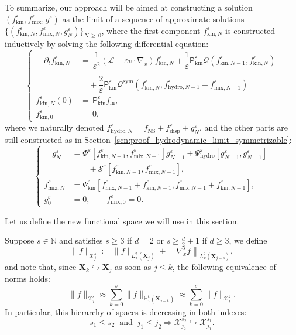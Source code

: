 \documentclass[AHL,Unicode,longabstracts,published]{cedram}
\newcommand{\ini}{\mathrm{in}}
\newcommand{\ns}{\mathrm{NS}}
\newcommand{\hyd}{\mathrm{hydro}}
\newcommand{\mix}{\mathrm{mix}}
\newcommand{\kin}{\mathrm{kin}}
\newcommand{\sym}{\mathrm{sym}}
\newcommand{\disp}{\mathrm{disp}}
\newcommand{\N}{\mathbb{N}}
\newcommand{\bbH}{\mathbb{H}}
\newcommand{\XX}{\mathcal{X}}
\newcommand{\LL}{\mathcal{L}}
\newcommand{\PP}{\mathsf{P}}
\newcommand{\QQ}{\mathcal{Q}}
\renewcommand{\SS}{\mathcal{S}}
\newcommand{\Sh}{\bm{X}}
\newcommand{\SSh}{\bm{\XX}}
\renewcommand*\le{\leqslant}
\renewcommand*\ge{\geqslant}
\renewcommand*\leq{\leqslant}
\renewcommand*\geq{\geqslant}
\newcommand*\eps{{\varepsilon}}
\begin{document}
To summarize, our approach will be aimed at constructing a solution $(f^\eps_\kin, f^\eps_\mix, g^\eps)$ as the limit of a sequence of approximate solutions $\{(f^\eps_{\kin, N}, f^\eps_{\mix, N}, g^\eps_N)\}_{N\,\geq\,0}$, where the first component $f_{\kin,N}^\eps$ is constructed inductively by solving the following differential equation:
\begin{equation}\label{eq:scheme}
\begin{cases}
\displaystyle
\quad\partial_t f^\eps_{\kin, N} &=\, \dfrac{1}{\eps^2} \left(\LL - \eps v \cdot \nabla_x\right) f^\eps_{\kin, N} + \dfrac{1}{\eps} \PP^\eps_\kin \QQ\left(f^\eps_{\kin, N-1}, f^\eps_{\kin, N}\right) \\  \\
&\quad  + \dfrac{2}{\eps} \PP^\eps_\kin \QQ^\sym\left(f^\eps_{\kin, N}, f^\eps_{\hyd, N-1} + f^\eps_{\mix, N-1}\right)\\
f^\eps_{\kin, N}(0) &= \,\PP^\eps_\kin f_\ini,\\
f^\eps_{\kin, 0} &=\, 0,
\end{cases}
\end{equation}
where we naturally denoted $f^\eps_{\hyd, N} = f_\ns + f^\eps_\disp + g^\eps_N$, and the other parts are still constructed as in Section~\ref{scn:proof_hydrodynamic_limit_symmetrizable}:
\begin{equation*}
\begin{cases}
\quad g^\eps_N &= \Phi^\eps\left[f^\eps_{\kin, N-1}, f^\eps_{\mix, N-1}\right] g^\eps_{N-1} + \Psi^\eps_\hyd\left[g^\eps_{N-1}, g^\eps_{N-1}\right] \\
&\qquad + \SS^\eps\left[f^\eps_{\kin, N-1}, f^\eps_{\mix, N-1}\right], \\
f^\eps_{\mix, N} &= \Psi^\eps_\kin\left[f^\eps_{\mix,N-1} + f^\eps_{\kin, N-1}, f^\eps_{\mix,N-1} + f^\eps_{\kin, N-1} \right], \\
g^\eps_0 &= 0, \qquad f^\eps_{\mix,0} = 0.
\end{cases}
\end{equation*}

Let us define the new functional space we will use in this section.
\begin{defi}
Suppose $s \in \N$ and satisfies $s \ge 3$ if $d = 2$ or $s \ge \frac{d}{2} + 1$ if $d \ge 3$, we define
\begin{equation*}
\| f \|_{ \SSh_j^s } := \| f \|_{ L^2_x \left(\Sh_j \right) } + \left\| \nabla_x^s f \right\|_{ L^2_x \left(\Sh_{j-s} \right) },
\end{equation*}
and note that, since $\Sh_k \hookrightarrow \Sh_j$ as soon as $j \leq k$, the following equivalence of norms holds:
\begin{equation*}
\| f \|_{ \SSh_j^s } \approx \sum_{k = 0}^{s} \| f \|_{ \bbH^k_x \left(\Sh_{j-k} \right) } \approx \sum_{k = 0}^{s} \| f \|_{ \SSh_j^k }.
\end{equation*}
In particular, this hierarchy of spaces is decreasing in both indexes:
\begin{equation}\label{eq:hierarchy_degenerate_spaces}
s_1 \le s_2~\text{ and }~j_1 \le j_2 \Longrightarrow \SSh_{j_2}^{s_2} \hookrightarrow \SSh_{j_1}^{s_1}.
\end{equation}
\end{defi}
\end{document}
